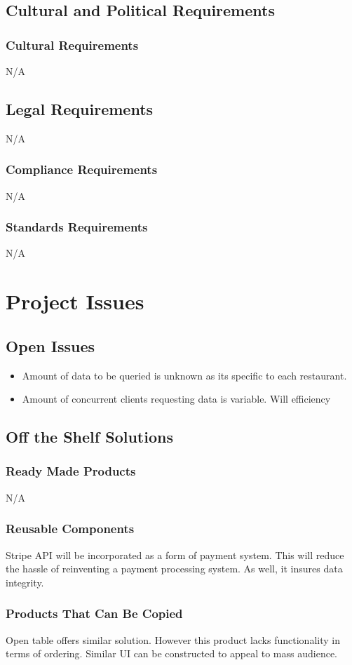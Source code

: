 \documentclass[12pt, titlepage]{article}
\begin{document}
\subsection{Cultural and Political Requirements}
\subsubsection{Cultural Requirements}
N/A
\subsection{Legal Requirements}
N/A
\subsubsection{Compliance Requirements}
N/A
\subsubsection{Standards Requirements}
N/A

\section{Project Issues}
\subsection{Open Issues}
\begin{itemize}
\item Amount of data to be queried is unknown as its specific to each restaurant.
\item Amount of concurrent clients requesting data is variable. Will efficiency
\end{itemize}
\subsection{Off the Shelf Solutions}
\subsubsection{Ready Made Products}
N/A
\subsubsection{Reusable Components}
Stripe API will be incorporated as a form of payment system. This will reduce the hassle of reinventing a payment processing system. As well, it insures data integrity.
 \subsubsection{Products That Can Be Copied} 
Open table offers similar solution. However this product lacks functionality in terms of ordering. Similar UI can be constructed to appeal to mass audience.  
\end{document}
